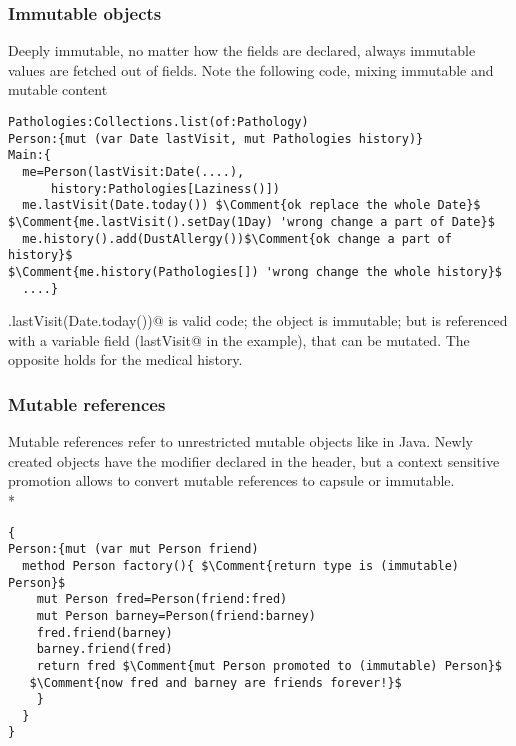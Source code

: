 \begin{frame}[fragile]
\frametitle{Immutable objects}
Deeply immutable,
no matter how the fields are declared, always immutable values are fetched out of fields.
Note the following code, mixing immutable and mutable content
\begin{lstlisting}
Pathologies:Collections.list(of:Pathology)
Person:{mut (var Date lastVisit, mut Pathologies history)}
Main:{
  me=Person(lastVisit:Date(....),
      history:Pathologies[Laziness()])
  me.lastVisit(Date.today()) $\Comment{ok replace the whole Date}$
$\Comment{me.lastVisit().setDay(1Day) 'wrong change a part of Date}$
  me.history().add(DustAllergy())$\Comment{ok change a part of history}$
$\Comment{me.history(Pathologies[]) 'wrong change the whole history}$
  ....}
  \end{lstlisting}
  
\Q@me.lastVisit(Date.today())@ is valid code; the \Q@Date@ object is immutable; but is  referenced
 with a variable field (\Q@var lastVisit@ in the example), that can be mutated. The opposite holds for the medical history.
\end{frame}

\begin{frame}[fragile]
\frametitle{Mutable references}
Mutable references refer to unrestricted mutable objects like in Java.
Newly created objects have the modifier declared in the header, but a context sensitive promotion allows to convert
mutable references to capsule or immutable.
\\*
\begin{NiceCode}{59ex}{0.8}
\begin{lstlisting}
{
Person:{mut (var mut Person friend)
  method Person factory(){ $\Comment{return type is (immutable) Person}$
    mut Person fred=Person(friend:fred)
    mut Person barney=Person(friend:barney)
    fred.friend(barney)  
    barney.friend(fred)
    return fred $\Comment{mut Person promoted to (immutable) Person}$
   $\Comment{now fred and barney are friends forever!}$
    }
  }
}
\end{lstlisting}
\end{NiceCode}

\end{frame}




